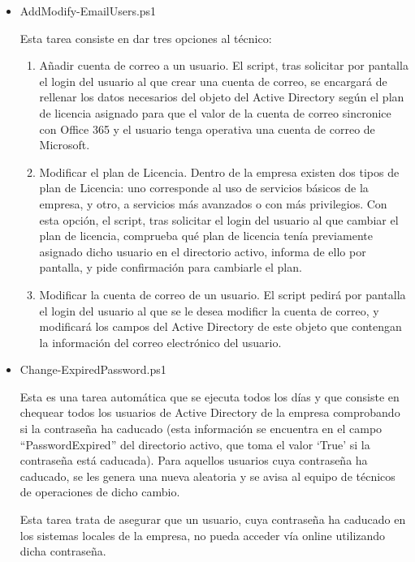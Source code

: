 \documentclass[a4paper, 12pt]{book}
\begin{document}
\begin{itemize}
 
\item AddModify-EmailUsers.ps1 

Esta tarea consiste en dar tres opciones al técnico:

	\begin{enumerate}

	\item Añadir cuenta de correo a un usuario. El script, tras solicitar por pantalla el login del usuario al que crear una cuenta de correo,  se encargará de rellenar los datos necesarios del objeto del Active Directory según el plan de licencia asignado para que el valor de la cuenta de correo sincronice con Office 365 y el usuario tenga operativa una cuenta de correo de Microsoft.

	\item Modificar el plan de Licencia. Dentro de la empresa existen dos tipos de plan de Licencia: uno corresponde al uso de servicios básicos de la empresa, y otro, a servicios más avanzados o con más privilegios. Con esta opción, el script, tras solicitar el login del usuario al que cambiar el plan de licencia, comprueba qué plan de licencia tenía previamente asignado dicho usuario en el directorio activo, informa de ello por pantalla, y pide confirmación para cambiarle el plan.

	\item Modificar la cuenta de correo de un usuario. El script pedirá por pantalla el login del usuario al que se le desea modificr la cuenta de correo, y modificará los campos del Active Directory de este objeto que contengan la información del correo electrónico del usuario.
	\end{enumerate}

\item Change-ExpiredPassword.ps1

Esta es una tarea automática que se ejecuta todos los días y que consiste en chequear todos los usuarios de Active Directory de la empresa comprobando si la contraseña ha caducado (esta información se encuentra en el campo “PasswordExpired” del directorio activo, que toma el valor ‘True’ si la contraseña está caducada). Para aquellos usuarios cuya contraseña ha caducado, se les genera una nueva aleatoria y se avisa al equipo de técnicos de operaciones de dicho cambio. 

Esta tarea trata de asegurar que un usuario, cuya contraseña ha caducado en los sistemas locales de la empresa, no pueda acceder vía online utilizando dicha contraseña.
\\


\end{itemize}
\end{document}
